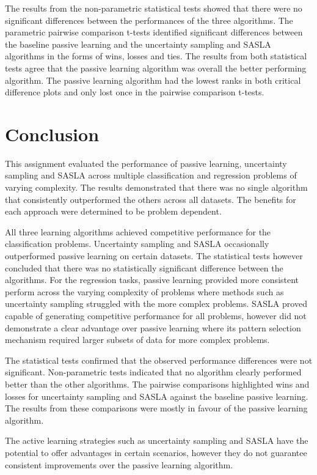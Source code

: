 \documentclass[conference]{IEEEtran}
\begin{document}
	The results from the non-parametric statistical tests showed that there were no significant differences between the performances of the three algorithms. The parametric pairwise comparison t-tests identified significant differences between the baseline passive learning and the uncertainty sampling and SASLA algorithms in the forms of wins, losses and ties. The results from both statistical tests agree that the passive learning algorithm was overall the better performing algorithm. The passive learning algorithm had the lowest ranks in both critical difference plots and only lost once in the pairwise comparison t-tests. 
	
	\section{Conclusion}\label{C}
	This assignment evaluated the performance of passive learning, uncertainty sampling and SASLA across multiple classification and regression problems of varying complexity. The results demonstrated that there was no single algorithm that consistently outperformed the others across all datasets. The benefits for each approach were determined to be problem dependent.
	
	All three learning algorithms achieved competitive performance for the classification problems. Uncertainty sampling and SASLA occasionally outperformed passive learning on certain datasets. The statistical tests however concluded that there was no statistically significant difference between the algorithms. For the regression tasks, passive learning provided more consistent perform across the varying complexity of problems where methods such as uncertainty sampling struggled with the more complex problems. SASLA proved capable of generating competitive performance for all problems, however did not demonstrate a clear advantage over passive learning where its pattern selection mechanism required larger subsets of data for more complex problems. 
	
	The statistical tests confirmed that the observed performance differences were not significant. Non-parametric tests indicated that no algorithm clearly performed better than the other algorithms. The pairwise comparisons highlighted wins and losses for uncertainty sampling and SASLA against the baseline passive learning. The results from these comparisons were mostly in favour of the passive learning algorithm.
	
	The active learning strategies such as uncertainty sampling and SASLA have the potential to offer advantages in certain scenarios, however they do not guarantee consistent improvements over the passive learning algorithm.
	
\end{document}
